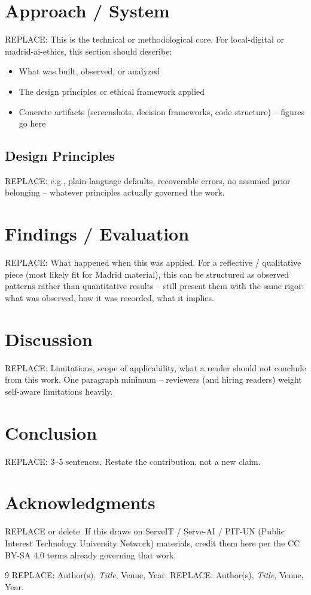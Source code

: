 \documentclass[10pt,twocolumn]{article}
\begin{document}
\section{Approach / System}
REPLACE: This is the technical or methodological core. For
local-digital or madrid-ai-ethics, this section should describe:
\begin{itemize}[leftmargin=*]
  \item What was built, observed, or analyzed
  \item The design principles or ethical framework applied
  \item Concrete artifacts (screenshots, decision frameworks, code
        structure) -- figures go here
\end{itemize}

\subsection{Design Principles}
REPLACE: e.g., plain-language defaults, recoverable errors, no assumed
prior belonging -- whatever principles actually governed the work.

\section{Findings / Evaluation}
REPLACE: What happened when this was applied. For a reflective /
qualitative piece (most likely fit for Madrid material), this can be
structured as observed patterns rather than quantitative results --
still present them with the same rigor: what was observed, how it was
recorded, what it implies.

\section{Discussion}
REPLACE: Limitations, scope of applicability, what a reader should not
conclude from this work. One paragraph minimum -- reviewers (and
hiring readers) weight self-aware limitations heavily.

\section{Conclusion}
REPLACE: 3--5 sentences. Restate the contribution, not a new claim.

\section*{Acknowledgments}
REPLACE or delete. If this draws on ServeIT / Serve-AI / PIT-UN
(Public Interest Technology University Network) materials, credit them
here per the CC BY-SA 4.0 terms already governing that work.

\begin{thebibliography}{9}
 REPLACE: Author(s), \textit{Title}, Venue, Year.
 REPLACE: Author(s), \textit{Title}, Venue, Year.
\end{thebibliography}
\end{document}
